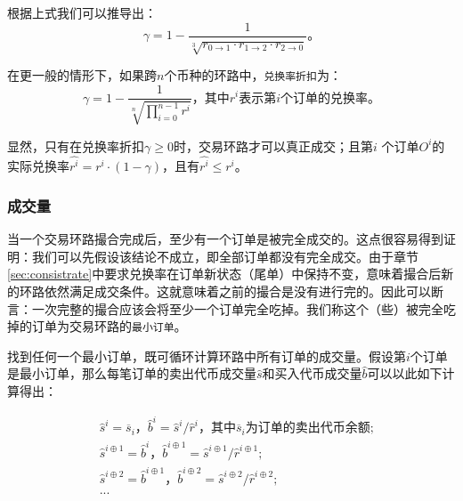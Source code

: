 \documentclass[UTF8,nofonts]{ctexart}
\begin{document}
根据上式我们可以推导出：
\begin{equation*}
\gamma = 1- \frac{1}{\sqrt[3]{r_{0\rightarrow 1} \cdot r_{1\rightarrow 2} \cdot r_{2\rightarrow 0}}}\text{。}
\end{equation*}

在更一般的情形下，如果跨$n$个币种的环路中，\texttt{兑换率折扣}为：
\begin{equation*}
\gamma = 1- \frac{1}{\sqrt[n]{\prod_{i=0}^{n-1} r^i}} \text{，其中} r^i \text{表示第}i\text{个订单的兑换率。}
\end{equation*}

显然，只有在兑换率折扣$\gamma \ge 0$时，交易环路才可以真正成交；且第$i$ 个订单$O^i$的实际兑换率$\hat{r^i} = r^i \cdot (1-\gamma)$，且有$\hat{r^i}\le r^i$。



\subsubsection{成交量\label{sec:matchquantity}}

当一个交易环路撮合完成后，至少有一个订单是被完全成交的。这点很容易得到证明：我们可以先假设该结论不成立，即全部订单都没有完全成交。由于章节\ref{sec:consistrate}中要求兑换率在订单新状态（尾单）中保持不变，意味着撮合后新的环路依然满足成交条件。这就意味着之前的撮合是没有进行完的。因此可以断言：一次完整的撮合应该会将至少一个订单完全吃掉。我们称这个（些）被完全吃掉的订单为交易环路的\texttt{最小订单}。

找到任何一个最小订单，既可循环计算环路中所有订单的成交量。假设第$i$个订单是最小订单，那么每笔订单的卖出代币成交量$\hat{s}$和买入代币成交量$\hat{b}$可以以此如下计算得出：

\[
\begin{split}
&\hat{s}^{i}=\overline{s}_i\text{，} \hat{b}^{i}=\hat{s}^{i} / \hat{r}^i \text{，其中}\overline{s}_i\text{为订单的卖出代币余额;}\\
&\hat{s}^{i\oplus 1}=\hat{b}^i\text{，} \hat{b}^{i\oplus 1}=\hat{s}^{i\oplus 1} / \hat{r}^{i\oplus 1}\text{;}\\
&\hat{s}^{i\oplus 2}=\hat{b}^{i\oplus 1}\text{，} \hat{b}^{i\oplus 2}=\hat{s}^{i\oplus 2} / \hat{r}^{i\oplus 2}\text{;}\\
& ...
\end{split}
\]
\end{document}
